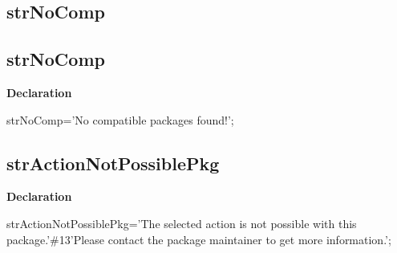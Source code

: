 \documentclass{report}
\newif\ifpdf
\begin{document}
\subsection*{\large{\textbf{strNoComp}}\normalsize\hspace{1ex}\hrulefill}
\else
\subsection*{strNoComp}
\fi
\label{trstrings-strNoComp}
\begin{list}{}{
\setlength{\itemindent}{0cm}
\setlength{\listparindent}{0cm}
\setlength{\leftmargin}{\evensidemargin}
\addtolength{\leftmargin}{\tmplength}
\settowidth{\labelsep}{X}
\addtolength{\leftmargin}{\labelsep}
\setlength{\labelwidth}{\tmplength}
}
\item[\textbf{Declaration}\hfill]
\ifpdf
\begin{flushleft}
\fi
\begin{ttfamily}
strNoComp='No compatible packages found!';\end{ttfamily}

\ifpdf
\end{flushleft}
\fi

\end{list}
\ifpdf
\subsection*{\large{\textbf{strActionNotPossiblePkg}}\normalsize\hspace{1ex}\hrulefill}
\else
\subsection*{strActionNotPossiblePkg}
\fi
\label{trstrings-strActionNotPossiblePkg}
\begin{list}{}{
\setlength{\itemindent}{0cm}
\setlength{\listparindent}{0cm}
\setlength{\leftmargin}{\evensidemargin}
\addtolength{\leftmargin}{\tmplength}
\settowidth{\labelsep}{X}
\addtolength{\leftmargin}{\labelsep}
\setlength{\labelwidth}{\tmplength}
}
\item[\textbf{Declaration}\hfill]
\ifpdf
\begin{flushleft}
\fi
\begin{ttfamily}
strActionNotPossiblePkg='The selected action is not possible with this package.'{\#}13'Please contact the package maintainer to get more information.';\end{ttfamily}

\ifpdf
\end{flushleft}
\fi

\end{list}
\ifpdf
\end{document}
